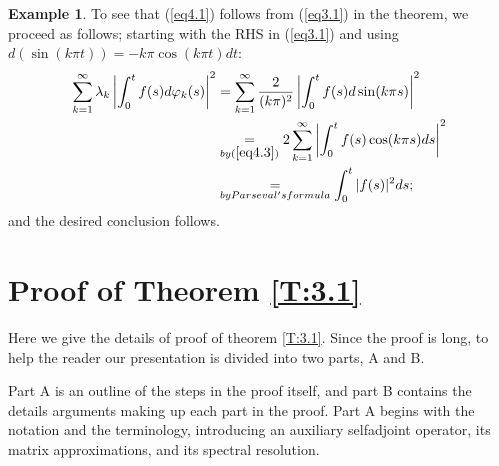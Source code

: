 \documentclass{amsart}
\theoremstyle{definition}
\newtheorem{example}[theorem]{Example}
\theoremstyle{remark}
\numberwithin{equation}{section}
\begin{document}
\begin{example}
  To see that (\ref{eq4.1}) follows from (\ref{eq3.1}) in the theorem, we 
  proceed as follows; starting with the RHS in (\ref{eq3.1}) and using 
  $d(\sin(k\pi t)) = -k\pi \cos(k\pi t)dt$:
  \begin{align*}
    \sum_{k=1}^{\infty}\lambda_{k} \left\vert 
           \int_{0}^{t}f(s)d\varphi_{k}(s)\right\vert^{2} &=
    \sum_{k=1}^{\infty}\frac{2}{(k\pi)^{2}}\left\vert 
    \int_{0}^{t}f(s)d\sin(k\pi s)\right\vert^{2}  \\
    &\underset{by (\ref{eq4.3})}{=}  
      2\sum_{k=1}^{\infty}\left\vert \int_{0}^{t}f(s)\cos(k\pi s)ds
      \right\vert^{2}  \\
    &\underset{by Parseval's formula}{=} \int_{0}^{t}|f(s)|^{2}ds; 
  \end{align*}
  and the desired conclusion follows.
\end{example}

\section{Proof of Theorem \ref{T:3.1}}
\label{sec:5}

Here we give the details of proof of theorem \ref{T:3.1}. Since the proof is 
long, to help the reader our presentation is divided into two 
parts, A and B.

Part A is an outline of the steps in the proof itself, and part B contains 
the details arguments making up each part in the proof. Part A begins with 
the notation and the terminology, introducing an auxiliary selfadjoint 
operator, its matrix approximations, and its spectral resolution.
\end{document}
